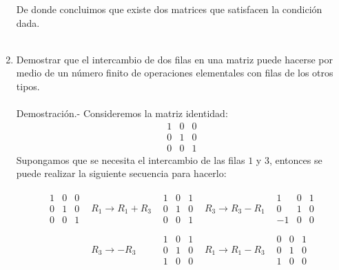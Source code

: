 \begin{enumerate}[\bfseries 1.]
	    De donde concluimos que existe dos matrices que satisfacen la condición dada.\\\\

    \item Demostrar que el intercambio de dos filas en una matriz puede hacerse por medio de un número finito de operaciones elementales con filas de los otros tipos.\\\\
	Demostración.-\; Consideremos la matriz identidad:
	$$\begin{matrix}
	    1 & 0 & 0 \\
	    0 & 1 & 0 \\
	    0 & 0 & 1
	\end{matrix}$$
	Supongamos que se necesita el intercambio de las filas $1$ y $3$, entonces se puede realizar la siguiente secuencia para hacerlo:

	$$\begin{array}{ccccc}

	    \begin{matrix}
		1 & 0 & 0 \\
		0 & 1 & 0 \\
		0 & 0 & 1
	    \end{matrix} 
	    &R_1 \to R_1+R_3&
	    \begin{matrix}
		1 & 0 & 1 \\
		0 & 1 & 0 \\
		0 & 0 & 1
	    \end{matrix} 
	    &R_3 \to R_3-R_1&
	    \begin{matrix}
		1 & 0 & 1 \\
		0 & 1 & 0 \\
		-1 & 0 & 0
	    \end{matrix}\\\\
	    &R_3  \to -R_3&
	    \begin{matrix}
		1 & 0 & 1 \\
		0 & 1 & 0 \\
		1 & 0 & 0
	    \end{matrix} 
	    &R_1 \to R_1-R_3& 
	    \begin{matrix}
		0 & 0 & 1 \\
		0 & 1 & 0 \\
		1 & 0 & 0
	    \end{matrix} 

	\end{array}$$


\end{enumerate}
